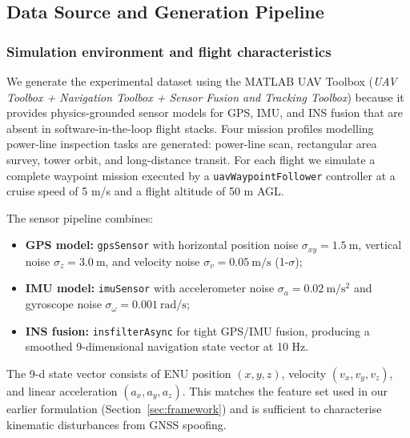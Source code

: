 
\subsection{Data Source and Generation Pipeline}
\label{sec:data}

\subsubsection{Simulation environment and flight characteristics}

We generate the experimental dataset using the MATLAB UAV Toolbox
(\textit{UAV Toolbox + Navigation Toolbox + Sensor Fusion and Tracking Toolbox})
because it provides physics-grounded sensor models for GPS, IMU, and INS fusion
that are absent in software-in-the-loop flight stacks.
Four mission profiles modelling power-line inspection tasks are generated:
power-line scan, rectangular area survey, tower orbit, and long-distance transit.
For each flight we simulate a complete waypoint mission executed by a
\texttt{uavWaypointFollower} controller at a cruise speed of 5 m/s
and a flight altitude of 50 m AGL.

The sensor pipeline combines:
\begin{itemize}
  \item \textbf{GPS model:} \texttt{gpsSensor} with horizontal position noise
        $\sigma_{xy}=\SI{1.5}{\metre}$, vertical noise $\sigma_z=\SI{3.0}{\metre}$,
        and velocity noise $\sigma_v=\SI{0.05}{\metre\per\second}$ (1-$\sigma$);
  \item \textbf{IMU model:} \texttt{imuSensor} with accelerometer noise
        $\sigma_a=\SI{0.02}{\metre\per\second\squared}$ and gyroscope noise
        $\sigma_\omega=\SI{0.001}{\radian\per\second}$;
  \item \textbf{INS fusion:} \texttt{insfilterAsync} for tight GPS/IMU fusion,
        producing a smoothed 9-dimensional navigation state vector at 10 Hz.
\end{itemize}

The 9-d state vector consists of ENU position $(x,y,z)$, velocity $(v_x,v_y,v_z)$,
and linear acceleration $(a_x,a_y,a_z)$. This matches the feature set used in
our earlier formulation (Section~\ref{sec:framework}) and is sufficient to
characterise kinematic disturbances from GNSS spoofing.

